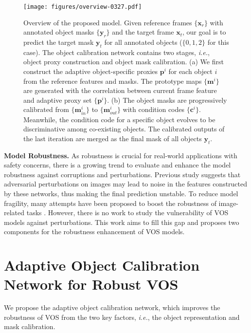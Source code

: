 \documentclass[sigconf]{acmart}
\begin{document}
\begin{figure*}[t]
	\centering
	\texttt{[image: figures/overview-0327.pdf]} 
	\caption{{Overview of the proposed model.} Given reference frames $\{\mathbf{x}_r \}$ with annotated object masks $\{\mathbf{y}_r \}$ and the target frame $\mathbf{x}_t$, our goal is to predict the target mask $\mathbf{y}_t$ for all annotated objects ($\{0,1,2\}$ for this case). The object calibration network contains two stages, \textit{i.e.}, object proxy construction and object mask calibration.
	(a) We first construct the adaptive object-specific proxies $\mathbf{p}^i$ for each object $i$ from the reference features and masks. 
	The prototype maps $\{\mathbf{m}^i\}$ are generated with the correlation between current frame feature and adaptive proxy set $\{\mathbf{p}^i \}$. 
    (b) The object masks are progressively calibrated from $\{\mathbf{m}_{in}^i\}$ to $\{\mathbf{m}_{out}^i\}$ with condition codes $\{\mathbf{c}^i\}$. Meanwhile, the condition code for a specific object evolves to be discriminative among co-existing objects. The calibrated outputs of the last iteration are merged as the final mask of all objects $\mathbf{y}_t$. 
	}
	\label{fig:PIPELINE}
\end{figure*}

    
\noindent\textbf{Model Robustness.} As robustness is crucial for real-world applications with safety concerns, there is a growing trend \cite{classification-robust,detection-robust, Segmentation-robust,10.1145/3474085.3475324,hendrycks2019benchmarking,kamann2020benchmarking} to evaluate and enhance the model robustness against corruptions and perturbations. Previous study \cite{xie2019feature} suggests that adversarial perturbations on images may lead to noise in the features constructed by these networks, thus making the final prediction unstable. To reduce model fragility, many attempts have been proposed to boost the robustness of image-related tasks \cite{robust_classification, robust_HOI}.  However, there is no work to study the vulnerability of VOS models against perturbations. This work aims to fill this gap and proposes two components for the robustness enhancement of VOS models.
 \section{Adaptive Object Calibration Network for Robust VOS}
We propose the adaptive object calibration network, which improves the robustness of VOS from the two key factors, \textit{i.e.}, the object representation and mask calibration.
      
\end{document}
